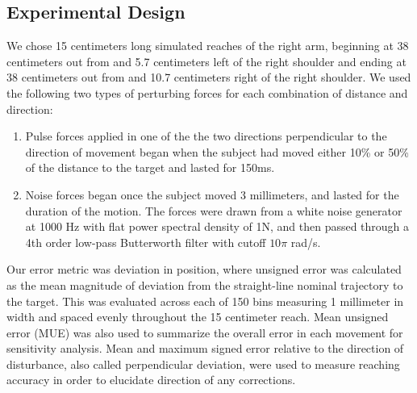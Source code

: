 \subsection*{Experimental Design}
We chose 15 centimeters long simulated reaches of the right arm, beginning at 38 centimeters out from and 5.7 centimeters left of the right shoulder and ending at 38 centimeters out from and 10.7 centimeters right of the right shoulder.  We used the following two types of perturbing forces for each combination of distance and direction: 
\begin{enumerate}
\item Pulse forces applied in one of the the two directions perpendicular to the direction of movement began when the subject had moved either 10\% or 50\% of the distance to the target and lasted for 150ms.
\item Noise forces began once the subject moved 3 millimeters, and lasted for the duration of the motion. The forces were drawn from a white noise generator at 1000 Hz with flat power spectral density of 1N, and then passed through a 4th order low-pass Butterworth filter with cutoff $10 \pi$ rad/s.
\end{enumerate}
Our error metric was deviation in position, where unsigned error was calculated as the mean magnitude of deviation from the straight-line nominal trajectory to the target. This was evaluated across each of 150 bins measuring 1 millimeter in width and spaced evenly throughout the 15 centimeter reach. Mean unsigned error (MUE) was also used to summarize the overall error in each movement for sensitivity analysis. Mean and maximum signed error relative to the direction of disturbance, also called perpendicular deviation, were used to measure reaching accuracy in order to elucidate direction of any corrections.


